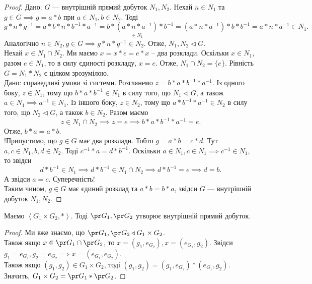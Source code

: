 \documentclass{math_library}
\begin{document}
\begin{proof}
\rightproof Дано: $G$ --- внутрішній прямий добуток $N_1,N_2$. Нехай $n \in N_1$ та $g \in G \implies g = a*b$ при $a \in N_1,b \in N_2$. Тоді \[
g*n*g^{-1} = a*b*n*b^{-1}*a^{-1} = b*\underset{\in N_1}{(a*n*a^{-1})}*b^{-1} = (a*n*a^{-1})*b*b^{-1} = a*n*a^{-1} \in N_1.
\]
Аналогічно $n \in N_2, g \in G \implies g*n*g^{-1} \in N_2$. Отже, $N_1,N_2 \triangleleft G$.\\
Нехай $x \in N_1 \cap N_2$. Ми маємо $x = x*e = e*x$ -- два розклади. Оскільки $x \in N_1$, разом $e \in N_1$, то в силу єдиності розкладу, $x = e$. Отже, $N_1 \cap N_2 = \{e\}$. Рівність $G = N_1*N_2$ є цілком зрозумілою.
\bigskip \\
\leftproof Дано: справедливі умови зі системи. Розглянемо $z = b*a*b^{-1}*a^{-1}$. Із одного боку, $z \in N_1$, тому що $b*a*b^{-1} \in N_1$ в силу того, що $N_1 \triangleleft G$, а також $a \in N_1 \implies a^{-1} \in N_1$. Із іншого боку, $z \in N_2$, тому що $a*b^{-1}*a^{-1} \in N_2$ в силу того, що $N_2 \triangleleft G$, а також $b \in N_2$. Разом маємо 
\[
z \in N_1 \cap N_2 \implies z = e \implies b*a*b^{-1}*a^{-1} = e.
\]
Отже, $b*a = a*b$.\\
!Припустимо, що $g \in G$ має два розклади. Тобто $g = a*b = c*d$. Тут $a,c \in N_1, b,d \in N_2$. Тоді $c^{-1}*a=d*b^{-1}$. Оскільки $a \in N_1, c \in N_1 \implies c^{-1} \in N_1$, то звідси 
\[
d*b^{-1} \in N_1 \implies d*b^{-1} \in N_1 \cap N_2 \implies d*b^{-1} = e \implies d = b.
\]
А звідси $a = c$. Суперечність!\\
Таким чином, $g \in G$ має єдиний розклад та $a*b=b*a$, звідси $G$ --- внутрішній добуток $N_1,N_2$.
\end{proof}

\begin{corollary}
Маємо $\left< G_1 \times G_2, * \right>$. Тоді $\pr G_1, \pr G_2$ утворює внутрішній прямий добуток.
\end{corollary}

\begin{proof}
Ми вже знаємо, що $\pr G_1, \pr G_2 \triangleleft G_1 \times G_2$.\\
Також якщо $x \in \pr G_1 \cap \pr G_2$, то $x = (g_1,e_{G_2}), x = (e_{G_1},g_2)$. Звідси $g_1 = e_{G_1}, g_2 = e_{G_2} \implies x = (e_{G_1},e_{G_2})$.\\
Також якщо $(g_1,g_2) \in G_1 \times G_2$, тоді $(g_1,g_2) = (g_1,e_{G_2})*(e_{G_1},g_2)$. Значить, $G_1 \times G_2 = \pr G_1 * \pr G_2$.
\end{proof}
\end{document}
